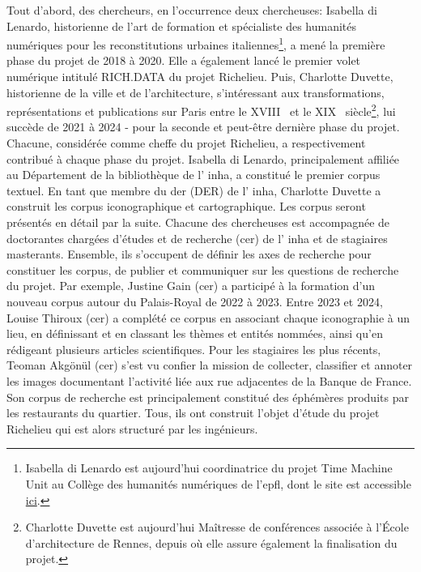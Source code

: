 Tout d'abord, des chercheurs, en l'occurrence deux chercheuses: Isabella di Lenardo, historienne de l'art de formation et spécialiste des humanités numériques pour les reconstitutions urbaines italiennes\footnote{Isabella di Lenardo est aujourd'hui coordinatrice du projet Time Machine Unit au Collège des humanités numériques de l'\acrshort{epfl}, dont le site est accessible \href{https://www.epfl.ch/schools/cdh/time-machine-unit/team/}{ici}.}, a mené la première phase du projet de 2018 à 2020. Elle a également lancé le premier volet numérique intitulé RICH.DATA du projet Richelieu. Puis, Charlotte Duvette, historienne de la ville et de l'architecture, s'intéressant aux transformations, représentations et publications sur Paris entre le XVIII\ieme~ et le XIX\ieme~  siècle\footnote{Charlotte Duvette est aujourd'hui Maîtresse de conférences associée à l'École d'architecture de Rennes, depuis où elle assure également la finalisation du projet.}, lui succède de 2021 à 2024 - pour la seconde et peut-être dernière phase du projet. Chacune, considérée comme cheffe du projet Richelieu, a respectivement contribué à chaque phase du projet. Isabella di Lenardo, principalement affiliée au Département de la bibliothèque de l' \acrshort{inha}, a constitué le premier corpus textuel. En tant que membre du \acrlong{der} (DER) de l' \acrshort{inha}, Charlotte Duvette a construit les corpus iconographique et cartographique. Les corpus seront présentés en détail par la suite. Chacune des chercheuses est accompagnée de doctorantes chargées d'études et de recherche (\acrshort{cer}) de l' \acrshort{inha} et de stagiaires masterants. Ensemble, ils s'occupent de définir les axes de recherche pour constituer les corpus, de publier et communiquer sur les questions de recherche du projet. Par exemple, Justine Gain (\acrshort{cer}) a participé à la formation d'un nouveau corpus autour du Palais-Royal de 2022 à 2023. Entre 2023 et 2024, Louise Thiroux (\acrshort{cer}) a complété ce corpus en associant chaque iconographie à un lieu, en définissant et en classant les thèmes et entités nommées, ainsi qu'en rédigeant plusieurs articles scientifiques. Pour les stagiaires les plus récents, Teoman Akgönül (\acrshort{cer}) s'est vu confier la mission de collecter, classifier et annoter les images documentant l'activité liée aux rue adjacentes de la Banque de France. Son corpus de recherche est principalement constitué des éphémères produits par les restaurants du quartier. Tous, ils ont construit l'objet d'étude du projet Richelieu qui est alors structuré par les ingénieurs.

